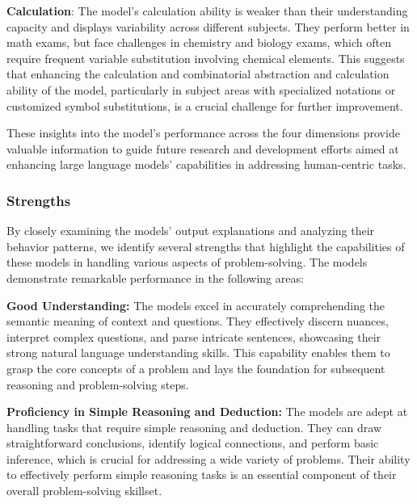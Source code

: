 \textbf{Calculation}: The model's calculation ability is weaker than their understanding capacity and displays variability across different subjects. They perform better in math exams, but face challenges in chemistry and biology exams, which often require frequent variable substitution involving chemical elements. This suggests that enhancing the calculation and combinatorial abstraction and calculation ability of the model, particularly in subject areas with specialized notations or customized symbol substitutions, is a crucial challenge for further improvement.

These insights into the model's performance across the four dimensions provide valuable information to guide future research and development efforts aimed at enhancing large language models' capabilities in addressing human-centric tasks.

\subsubsection{Strengths}
\label{sec:strength}
By closely examining the models' output explanations and analyzing their behavior patterns, we identify several strengths that highlight the capabilities of these models in handling various aspects of problem-solving. The models demonstrate remarkable performance in the following areas:
\par
\textbf{Good Understanding:} The models excel in accurately comprehending the semantic meaning of context and questions. They effectively discern nuances, interpret complex questions, and parse intricate sentences, showcasing their strong natural language understanding skills. This capability enables them to grasp the core concepts of a problem and lays the foundation for subsequent reasoning and problem-solving steps.
\par
\textbf{Proficiency in Simple Reasoning and Deduction:} The models are adept at handling tasks that require simple reasoning and deduction. They can draw straightforward conclusions, identify logical connections, and perform basic inference, which is crucial for addressing a wide variety of problems. Their ability to effectively perform simple reasoning tasks is an essential component of their overall problem-solving skillset.

